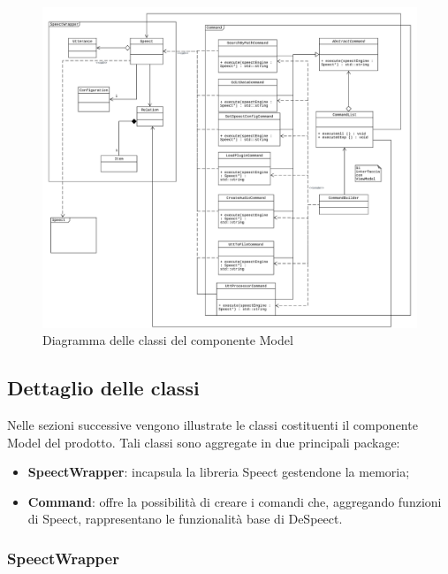 \documentclass[openany,12pt,a4paper]{report}
\begin{document}
\begin{figure}[H]
	\hspace*{-20mm}
	\includegraphics[scale=0.5]{ModelDiagram}
	\centering
	\caption{Diagramma delle classi del componente Model}
\end{figure}

\subsection{Dettaglio delle classi}

Nelle sezioni successive vengono illustrate le classi costituenti il componente Model del prodotto. Tali classi sono aggregate in due principali package:
\begin{itemize}
	\item \textbf{SpeectWrapper}: incapsula la libreria Speect gestendone la memoria;
	\item \textbf{Command}: offre la possibilità di creare i comandi che, aggregando funzioni di Speect, rappresentano le funzionalità base di DeSpeect.
\end{itemize}

\subsubsection{SpeectWrapper}
\end{document}

